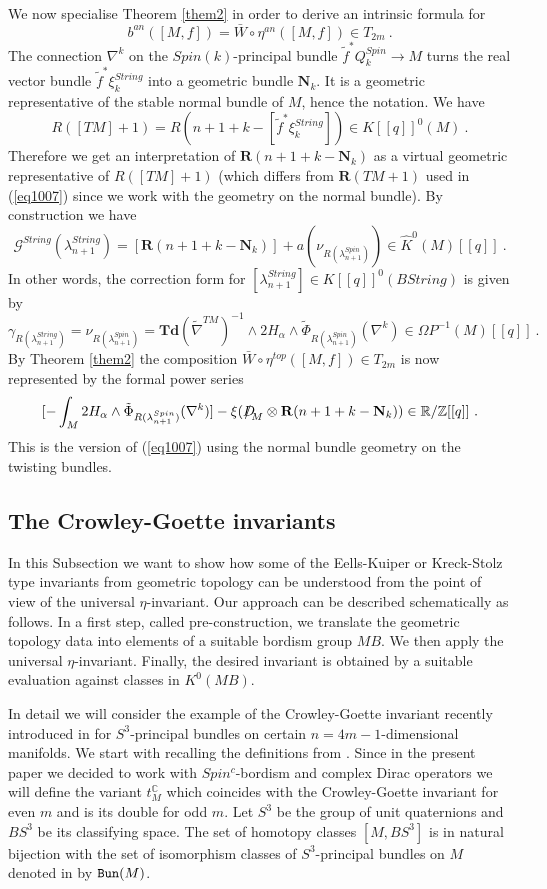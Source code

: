 \documentclass[12pt]{article}
\newcommand{\Bun}{{\tt Bun}}
\newcommand{\bN}{{\mathbf{N}}}
\newcommand{\cG}{{\mathcal{G}}}
\newcommand{\Z}{{\mathbb{Z}}}
\newcommand{\R}{{\mathbb{R}}}
\newcommand{\C}{{\mathbb{C}}}
\newcommand{\Td}{{\mathbf{Td}}}
\newcommand{\bR}{{\mathbf{R}}}
\newcommand{\Dirac}{{D\hspace{-0.27cm}/}}
\begin{document}
 



We now specialise  Theorem
\ref{them2} in order to derive an intrinsic formula for $$b^{an}([M,f])=\bar W\circ \eta^{an}([M,f])\in T_{2m}\ .$$ The connection $\nabla^{k}$ on the $Spin(k)$-principal bundle $\tilde f^{*}Q^{Spin}_{k}\to M$ turns the real vector bundle $\tilde f^{*}\xi^{String}_{k}$ into a geometric bundle $\bN_{k}$. It is a geometric representative of the stable normal bundle of $M$, hence the notation. 
We have  $$R([TM]+1)=R(n+1+k-[\tilde f^{*} \xi^{String}_{k}])\in K[[q]]^{0}(M)\ .$$ Therefore we get an interpretation of $\bR(n+1+k-\bN_{k})$ as a virtual geometric representative of $R([TM]+1)$ (which differs from $\bR(TM+ 1)$ used in (\ref{eq1007}) since we work with the geometry on the normal bundle).  By construction we have
$$\cG^{String}(\lambda^{String}_{n+1})=[\bR(n+1+k-\bN_{k})]+a(\nu_{R(\lambda^{Spin}_{n+1})})\in \hat K^{0}(M)[[q]]\ .$$
In other words, the correction form for $[\lambda^{String}_{n+1}]\in K[[q]]^{0}(BString)$ is given by
$$\gamma_{R(\lambda^{String}_{n+1})}=\nu_{R(\lambda^{Spin}_{n+1})}=
\Td(\tilde \nabla^{TM})^{-1}\wedge 2H_{\alpha}\wedge \tilde  \Phi_{R(\lambda^{Spin}_{n+1})}(\nabla^{k})\in \Omega P^{-1}(M)[[q]]\ .$$
By  
Theorem
\ref{them2}
the composition $\bar W\circ \eta^{top}([M,f])\in T_{2m}$ is now represented by the formal power series
$$[- \int_{M}2H_{\alpha}\wedge \tilde \Phi_{R(\lambda^{Spin}_{n+1})}(\nabla^{k})]-\xi(\Dirac_{M}\otimes \bR(n+1+k-\bN_{k}))\in \R/\Z[[q]]\ .$$
This is the version of  (\ref{eq1007})  using the normal bundle geometry on the twisting bundles.

\subsection{The Crowley-Goette invariants} \label{subseccg}

In this Subsection we want to show how some of the  Eells-Kuiper or Kreck-Stolz type invariants from geometric topology can be understood from the point of view of the universal $\eta$-invariant. Our approach can be described schematically as follows. In a first step, called pre-construction, we translate the geometric topology data into elements of a suitable bordism group $MB$. We then apply the universal $\eta$-invariant. Finally, the desired invariant is obtained  by a suitable evaluation against classes in $K^{0}(MB)$.

In detail we will consider the example of the  Crowley-Goette invariant  recently introduced in \cite{2010arXiv1012.5237C} for $S^{3}$-principal bundles on certain $n=4m-1$-dimensional manifolds. We start with recalling the definitions from  \cite{2010arXiv1012.5237C}.  Since in the present paper we decided to work with $Spin^{c}$-bordism and complex Dirac operators we will define the variant $t^{\C}_{M}$ which coincides with the Crowley-Goette  invariant for even $m$ and is its double for odd $m$.
Let $S^{3}$ be the group of unit quaternions and $BS^{3}$ be its classifying space. The set of homotopy classes $[M,BS^{3}]$ is in natural bijection with the set of isomorphism classes of $S^{3}$-principal bundles
on $M$ denoted in \cite{2010arXiv1012.5237C} by $\Bun(M)$.
\end{document}
